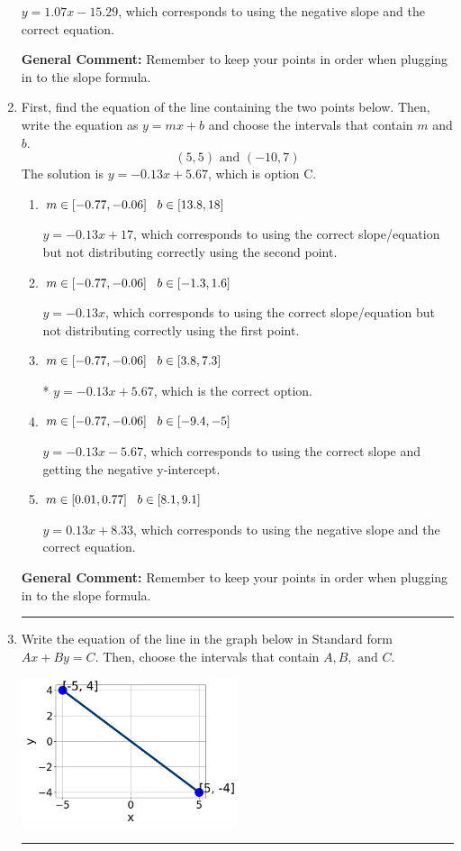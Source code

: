 \documentclass{extbook}[14pt]
\newcommand{\litem}[1]{\item #1

\rule{\textwidth}{0.4pt}}
\begin{document}
\begin{enumerate}
{\begin{enumerate}[label=\Alph*.]
 $y = 1.07x -15.29$, which corresponds to using the negative slope and the correct equation.
\end{enumerate}

\textbf{General Comment:} Remember to keep your points in order when plugging in to the slope formula.
}
\litem{
First, find the equation of the line containing the two points below. Then, write the equation as $ y=mx+b $ and choose the intervals that contain $m$ and $b$.
\[ (5, 5) \text{ and } (-10, 7) \]The solution is \( y = -0.13x + 5.67 \), which is option C.\begin{enumerate}[label=\Alph*.]
\item \( m \in [-0.77, -0.06] \hspace*{3mm} b \in [13.8, 18] \)

 $y = -0.13x + 17$, which corresponds to using the correct slope/equation but not distributing correctly using the second point.
\item \( m \in [-0.77, -0.06] \hspace*{3mm} b \in [-1.3, 1.6] \)

 $y = -0.13x$, which corresponds to using the correct slope/equation but not distributing correctly using the first point.
\item \( m \in [-0.77, -0.06] \hspace*{3mm} b \in [3.8, 7.3] \)

* $y = -0.13x + 5.67$, which is the correct option.
\item \( m \in [-0.77, -0.06] \hspace*{3mm} b \in [-9.4, -5] \)

 $y = -0.13x -5.67$, which corresponds to using the correct slope and getting the negative y-intercept.
\item \( m \in [0.01, 0.77] \hspace*{3mm} b \in [8.1, 9.1] \)

 $y = 0.13x + 8.33$, which corresponds to using the negative slope and the correct equation.
\end{enumerate}

\textbf{General Comment:} Remember to keep your points in order when plugging in to the slope formula.
}
\litem{
Write the equation of the line in the graph below in Standard form $Ax+By=C$. Then, choose the intervals that contain $A, B, \text{ and } C$.

\begin{center}
    \includegraphics[width=0.5\textwidth]{../Figures/linearGraphToStandardCopyA.png}
\end{center}


}
\end{enumerate}
\end{document}
